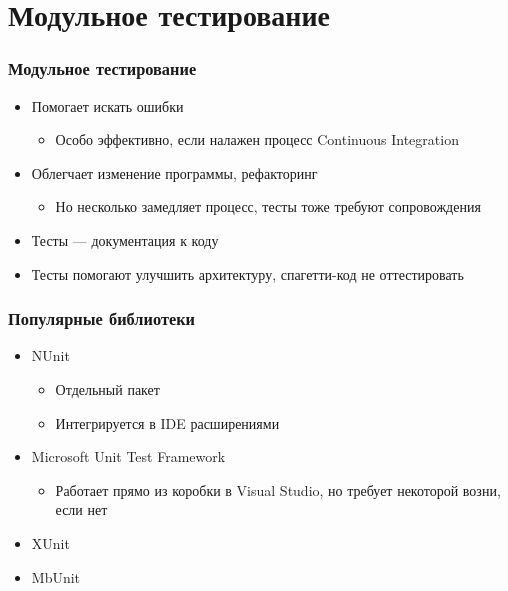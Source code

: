 \documentclass[xetex,mathserif,serif]{beamer}
\begin{document}
	\section{Модульное тестирование}

	\begin{frame}
		\frametitle{Модульное тестирование}
		\begin{itemize}
			\item Помогает искать ошибки
			\begin{itemize}
				\item Особо эффективно, если налажен процесс Continuous Integration
			\end{itemize}
			\item Облегчает изменение программы, рефакторинг
			\begin{itemize}
				\item Но несколько замедляет процесс, тесты тоже требуют сопровождения
			\end{itemize}
			\item Тесты --- документация к коду
			\item Тесты помогают улучшить архитектуру, спагетти-код не оттестировать
		\end{itemize}
	\end{frame}

	\begin{frame}
		\frametitle{Популярные библиотеки}
		\begin{itemize}
			\item NUnit
			\begin{itemize}
				\item Отдельный пакет
				\item Интегрируется в IDE расширениями
			\end{itemize}
			\item Microsoft Unit Test Framework
			\begin{itemize}
				\item Работает прямо из коробки в Visual Studio, но требует некоторой возни, если нет
			\end{itemize}
			\item XUnit
			\item MbUnit
		\end{itemize}
	\end{frame}
\end{document}
